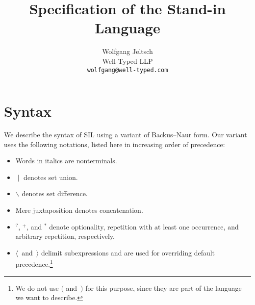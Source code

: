 \documentclass{scrartcl}
\title{Specification of the Stand-in Language}
\author{%
    Wolfgang Jeltsch\\
    \small Well-Typed LLP\\
    \small\texttt{wolfgang@well-typed.com}%
}
\newcommand{\optional}{^?}
\newcommand{\some}{^+}
\newcommand{\many}{^*}
\begin{document}
\maketitle

\section{Syntax}

We describe the syntax of SIL using a variant of Backus–Naur form. Our
variant uses the following notations, listed here in increasing order of
precedence:
\begin{itemize}

\item

Words in italics are nonterminals.

\item

$∣$ denotes set union.

\item

$∖$ denotes set difference.

\item

Mere juxtaposition denotes concatenation.

\item

$\optional$, $\some$, and $\many$ denote optionality, repetition with at
least one occurrence, and arbitrary repetition, respectively.

\item

$⟨$~and~$⟩$ delimit subexpressions and are used for overriding default
precedence.\footnote{We do not use $($ and~$)$ for this purpose, since
they are part of the language we want to describe.}

\end{itemize}
\end{document}
